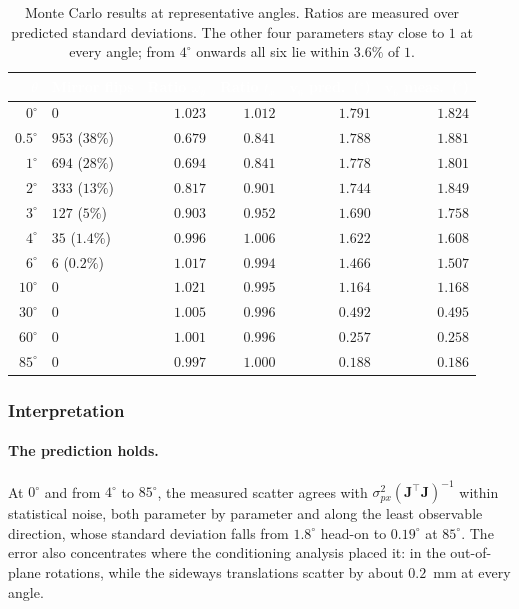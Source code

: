 \documentclass[11pt,a4paper]{article}
\theoremstyle{definition}
\theoremstyle{plain}
\theoremstyle{remark}
\newcommand{\thcell}[1]{\textcolor{white}{\textbf{#1}}}
\begin{document}
\begin{table}[h!]
\centering\small
\begin{tabularx}{\linewidth}{@{}rYrrrr@{}}
\toprule
{}\thcell{$\theta$}&\thcell{Mirror flips}&\thcell{Ratio $\omega_y$}&\thcell{Ratio $t_x$}&\thcell{$\mathbf{v}_6$ pred.\ ($^\circ$)}&\thcell{$\mathbf{v}_6$ meas.\ ($^\circ$)}\\
\midrule
$0^\circ$ & $0$ & $1.023$ & $1.012$ & $1.791$ & $1.824$\\
 $0.5^\circ$ & $953$ ($38\%$) & $0.679$ & $0.841$ & $1.788$ & $1.881$\\
$1^\circ$ & $694$ ($28\%$) & $0.694$ & $0.841$ & $1.778$ & $1.801$\\
 $2^\circ$ & $333$ ($13\%$) & $0.817$ & $0.901$ & $1.744$ & $1.849$\\
$3^\circ$ & $127$ ($5\%$) & $0.903$ & $0.952$ & $1.690$ & $1.758$\\
 $4^\circ$ & $35$ ($1.4\%$) & $0.996$ & $1.006$ & $1.622$ & $1.608$\\
$6^\circ$ & $6$ ($0.2\%$) & $1.017$ & $0.994$ & $1.466$ & $1.507$\\
 $10^\circ$ & $0$ & $1.021$ & $0.995$ & $1.164$ & $1.168$\\
$30^\circ$ & $0$ & $1.005$ & $0.996$ & $0.492$ & $0.495$\\
 $60^\circ$ & $0$ & $1.001$ & $0.996$ & $0.257$ & $0.258$\\
$85^\circ$ & $0$ & $0.997$ & $1.000$ & $0.188$ & $0.186$\\
\bottomrule
\end{tabularx}
\caption{Monte Carlo results at representative angles. Ratios are measured over
predicted standard deviations. The other four parameters stay close to $1$ at
every angle; from $4^\circ$ onwards all six lie within $3.6\%$ of $1$.}
\label{tab:montecarlo}
\end{table}

\subsubsection{Interpretation}

\paragraph{The prediction holds.} At $0^\circ$ and from $4^\circ$ to $85^\circ$,
the measured scatter agrees with $\sigma_{px}^2(\mathbf{J}^\top\mathbf{J})^{-1}$
within statistical noise, both parameter by parameter and along the least
observable direction, whose standard deviation falls from $1.8^\circ$ head-on to
$0.19^\circ$ at $85^\circ$. The error also concentrates where the conditioning
analysis placed it: in the out-of-plane rotations, while the sideways
translations scatter by about $0.2$~mm at every angle.
\end{document}
